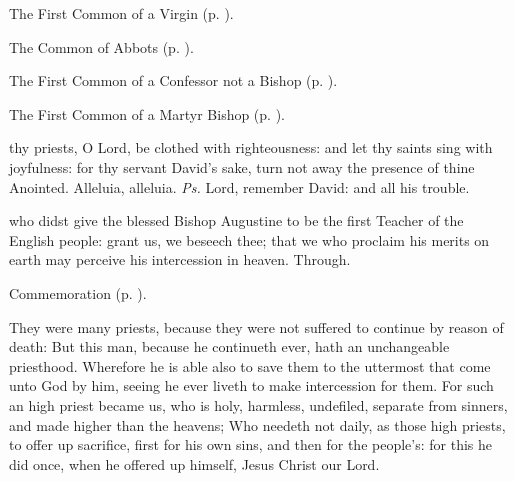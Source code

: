 
\begin{rubric}
	The First Common of a Virgin (p. \pageref{CommonVirginOnlyI}).
\end{rubric}



\begin{rubric}
	The Common of Abbots (p. \pageref{CommonAbbots}).
\end{rubric}



\begin{rubric}
	The First Common of a Confessor not a Bishop (p. \pageref{CommonConfessorNotBishopI}).
\end{rubric}



\begin{rubric}
	The First Common of a Martyr Bishop (p. \pageref{CommonMartyrBishopI}).
\end{rubric}


\clearpage
{}

\introit
{} thy priests, O Lord, be clothed with righteousness: and let thy saints sing with joyfulness: for thy servant David's sake, turn not away the presence of thine Anointed. Alleluia, alleluia. \textit{Ps.} Lord, remember David: and all his trouble.

\collect
{} who didst give the blessed Bishop Augustine to be the first Teacher of the English people: grant us, we beseech thee; that we who proclaim his merits on earth may perceive his intercession in heaven. Through.

\begin{rubric}
	Commemoration  (p. \pageref{EleutheriusCollect}).
\end{rubric}

 They were many priests, because they were not suffered to continue by reason of death: But this man, because he continueth ever, hath an unchangeable priesthood. Wherefore he is able also to save them to the uttermost that come unto God by him, seeing he ever liveth to make intercession for them. For such an high priest became us, who is holy, harmless, undefiled, separate from sinners, and made higher than the heavens; Who needeth not daily, as those high priests, to offer up sacrifice, first for his own sins, and then for the people's: for this he did once, when he offered up himself, Jesus Christ our Lord.

